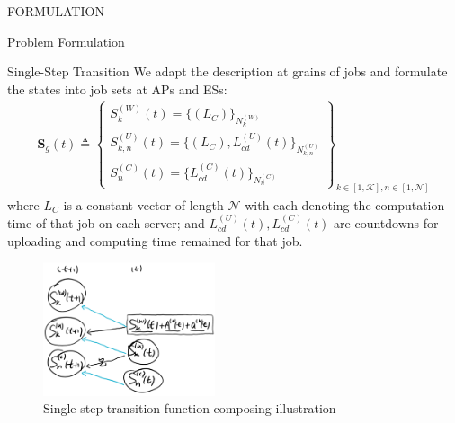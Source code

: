 \documentclass[10pt, conference, letterpaper]{IEEEtran}
\begin{document}
\begin{section}{FORMULATION}
\begin{subsection}{Problem Formulation}
            \begin{subsubsection}{Single-Step Transition}
                We adapt the description at grains of jobs and formulate the states into job sets at APs and ESs:
                \begin{gather*}
                    \mathbf{S}_g(t) \triangleq
                    \begin{Bmatrix}
                        S_{k}^{(W)}(t) = \{ (L_C) \}_{N_{k}^{(W)}}
                        \\
                        S_{k,n}^{(U)}(t)= \{ (L_C), L_{cd}^{(U)}(t) \}_{N_{k,n}^{(U)}}
                        \\
                        S_{n}^{(C)}(t)  = \{ L_{cd}^{(C)}(t) \}_{N_{n}^{(C)}}
                    \end{Bmatrix}
                    _{k \in [1,\mathcal{K}], n \in [1,\mathcal{N}]}
                \end{gather*}
                where $L_C$ is a constant vector of length $\mathcal{N}$ with each denoting the computation time of that job on each server; and $L^{(U)}_{cd}(t), L^{(C)}_{cd}(t)$ are countdowns for uploading and computing time remained for that job.
            
                \begin{figure}[h]
                    \centering
                    \includegraphics[width=0.45\textwidth]{single-transition.png}
                    \caption{Single-step transition function composing illustration}
                    \label{fig:trans}
                \end{figure}


\end{subsubsection}
\end{subsection}
\end{section}
\end{document}
